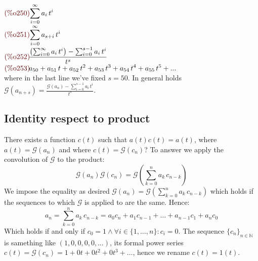 \begin{math}\displaystyle
\parbox{8ex}{\color{labelcolor}(\%o250) }
\sum_{i=0}^{\infty }{a}_{i}\,{t}^{i}
\end{math}\\
\begin{math}\displaystyle
\parbox{8ex}{\color{labelcolor}(\%o251) }
\sum_{i=0}^{\infty }{a}_{s+i}\,{t}^{i}
\end{math}\\
\begin{math}\displaystyle
\parbox{8ex}{\color{labelcolor}(\%o252) }
\frac{\left( \sum_{i=0}^{\infty }{a}_{i}\,{t}^{i}\right) -\sum_{i=0}^{s-1}{a}_{i}\,{t}^{i}}{{t}^{s}}
\end{math}\\
\begin{math}\displaystyle
\parbox{8ex}{\color{labelcolor}(\%o253) }
{a}_{50}+{a}_{51}\,t+{a}_{52}\,{t}^{2}+{a}_{53}\,{t}^{3}+{a}_{54}\,{t}^{4}+{a}_{55}\,{t}^{5}+...
\end{math}\\
where in the last line we've fixed $s = 50$. In general holds
$\mathcal{G}(a_{n+s}) = \frac{\mathcal{G} (a_n)
  -\sum_{i=0}^{s-1}{a}_{i}\,{t}^{i}}{{t}^{s}}$.

\subsection{Identity respect to product}

There exists a function $c(t)$ such that $a(t)c(t)=a(t)$, where $a(t)
= \mathcal{G} (a_n)$ and where $c(t) = \mathcal{G} (c_n)$? To answer
we apply the convolution of $\mathcal{G} $ to the product:
\begin{displaymath}
  \mathcal{G} (a_n)\mathcal{G} (c_n) = \mathcal{G}\left(
    \sum_{k=0}^{n}{a}_{k}\,{c}_{n-k}\right)
\end{displaymath}
We impose the equality as desired $\mathcal{G} (a_n) = \mathcal{G}\left(
  \sum_{k=0}^{n}{a}_{k}\,{c}_{n-k}\right)$ which holds if the
sequences to which $\mathcal{G} $ is applied to are the same. Hence:
\begin{displaymath}
  a_n = \sum_{k=0}^{n}{a}_{k}\,{c}_{n-k} = a_0 c_n + a_1 c_{n-1} +
  \ldots + a_{n-1} c_1 + a_n c_0
\end{displaymath}
Which holds if and only if $c_0 = 1 \wedge \forall
i\in\{1,\ldots,n\}:c_i = 0$. The sequence $\{c_n\}_{n\in \mathbb{N} }$
is samething like $(1,0,0,0,0,\ldots)$, its formal power series $c(t)
= \mathcal{G}(c_n) = 1 + 0t + 0t^2 + 0t^3 + \ldots $, hence we rename
$c(t) = 1(t)$.

